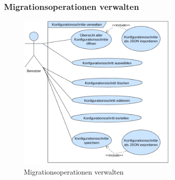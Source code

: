 \subsubsection{Migrationsoperationen verwalten}
\begin{figure}[H]
	\centering
	\includegraphics[width=0.7\textwidth]{images/af/af-ks-verwalten}
	\caption{Migrationsoperationen verwalten}
	\label{img:af-ks-verwalten}
\end{figure}


